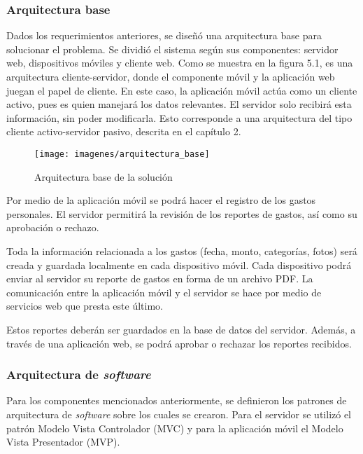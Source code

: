 \subsubsection*{Arquitectura base}

Dados los requerimientos anteriores, se diseñó una arquitectura base para solucionar el problema. Se dividió el sistema según sus componentes: servidor web, dispositivos móviles y cliente web. Como se muestra en la figura 5.1, es una arquitectura cliente-servidor, donde el componente móvil y la aplicación web juegan el papel de cliente. En este caso, la aplicación móvil actúa como un cliente activo, pues es quien manejará los datos relevantes. El servidor solo recibirá esta información, sin poder modificarla. Esto corresponde a una arquitectura del tipo cliente activo-servidor pasivo, descrita en el capítulo 2.

\begin{figure}[ht]
  \centering
  \texttt{[image: imagenes/arquitectura\_base]}
  \caption{Arquitectura base de la solución}
  \label{fig:arquitecturaBase}
\end{figure}

Por medio de la aplicación móvil se podrá hacer el registro de los gastos personales. El servidor permitirá la revisión de los reportes de gastos, así como su aprobación o rechazo.

Toda la información relacionada a los gastos (fecha, monto, categorías, fotos) será creada y guardada localmente en cada dispositivo móvil. Cada dispositivo podrá enviar al servidor su reporte de gastos en forma de un archivo PDF. La comunicación entre la aplicación móvil y el servidor se hace por medio de servicios web que presta este último.

Estos reportes deberán ser guardados en la base de datos del servidor. Además, a través de una aplicación web, se podrá aprobar o rechazar los reportes recibidos.

\subsubsection*{Arquitectura de \textit{software}}

Para los componentes mencionados anteriormente, se definieron los patrones de arquitectura de \textit{software} sobre los cuales se crearon. Para el servidor se utilizó el patrón Modelo Vista Controlador (MVC) y para la aplicación móvil el Modelo Vista Presentador (MVP).

